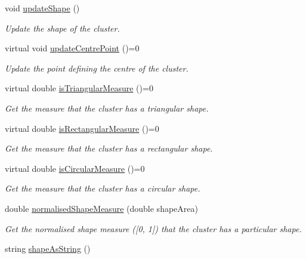 \begin{DoxyCompactItemize}
void \hyperlink{classmultiscale_1_1analysis_1_1SpatialEntityPseudo3D_ad50d0866df26b63dc86853a9ab0c545d}{update\-Shape} ()
\begin{DoxyCompactList}\small\item\em \-Update the shape of the cluster. \end{DoxyCompactList}\item 
virtual void \hyperlink{classmultiscale_1_1analysis_1_1SpatialEntityPseudo3D_a8e81fdb72e8510d8f77ce8b518a74843}{update\-Centre\-Point} ()=0
\begin{DoxyCompactList}\small\item\em \-Update the point defining the centre of the cluster. \end{DoxyCompactList}\item 
virtual double \hyperlink{classmultiscale_1_1analysis_1_1SpatialEntityPseudo3D_ac0e5bce32290f2595293bd7386e04de1}{is\-Triangular\-Measure} ()=0
\begin{DoxyCompactList}\small\item\em \-Get the measure that the cluster has a triangular shape. \end{DoxyCompactList}\item 
virtual double \hyperlink{classmultiscale_1_1analysis_1_1SpatialEntityPseudo3D_ad2984ec212e74437f3c7f3fc18ad555c}{is\-Rectangular\-Measure} ()=0
\begin{DoxyCompactList}\small\item\em \-Get the measure that the cluster has a rectangular shape. \end{DoxyCompactList}\item 
virtual double \hyperlink{classmultiscale_1_1analysis_1_1SpatialEntityPseudo3D_a31066d1038679f8e9080719380403cad}{is\-Circular\-Measure} ()=0
\begin{DoxyCompactList}\small\item\em \-Get the measure that the cluster has a circular shape. \end{DoxyCompactList}\item 
double \hyperlink{classmultiscale_1_1analysis_1_1SpatialEntityPseudo3D_aaceb2d7941931c472a947925df1e0988}{normalised\-Shape\-Measure} (double shape\-Area)
\begin{DoxyCompactList}\small\item\em \-Get the normalised shape measure (\mbox{[}0, 1\mbox{]}) that the cluster has a particular shape. \end{DoxyCompactList}\item 
string \hyperlink{classmultiscale_1_1analysis_1_1SpatialEntityPseudo3D_a347c52b3cfad183a608ddbd018d8e409}{shape\-As\-String} ()

\end{DoxyCompactItemize}

